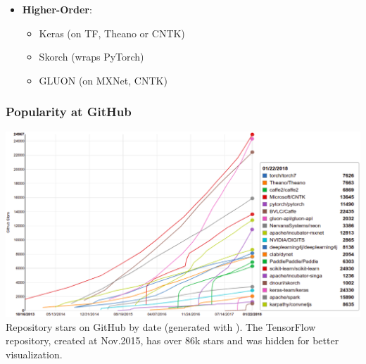 \documentclass[hyperref={pdfpagelabels=false}]{beamer}
\begin{document}
\begin{frame}
\begin{minipage}[t]{0.45\textwidth}
       \end{minipage}%
       \hfill
       \begin{minipage}[t]{0.55\textwidth}
         \vspace{0pt}
         \begin{itemize}[<.->]
           \item  \textbf{Higher-Order}:
             \begin{itemize}[<.->]
             \item \small{\textcolor{visiblered}{Keras (on TF, Theano or CNTK)}}
             \item \small{\textcolor{visiblered}{Skorch (wraps PyTorch)}}
             \item \small{\textcolor{visiblered}{GLUON (on MXNet, CNTK)}}
             \end{itemize}
           \end{itemize}
       \end{minipage}
     \end{frame}



    


     \begin{frame}
       \frametitle{Popularity at GitHub}
       \centering
       \includegraphics[scale=0.28]{github_stars_no_tf.png}
       \scriptsize{\\Repository stars on GitHub by date (generated with \cite{github-stars}). The TensorFlow repository, created at Nov.2015, has over 86k stars and was hidden for better visualization.}
     \end{frame}
\end{document}
